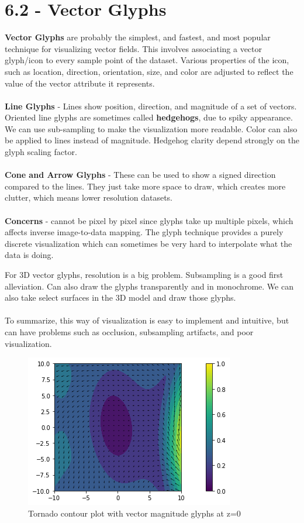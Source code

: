 \documentclass{article}
\begin{document}
\section*{6.2 - Vector Glyphs}
\textbf{Vector Glyphs} are probably the simplest, and fastest, and most popular technique for visualizing vector fields. This involves associating a vector glyph/icon to every sample point of the dataset. Various properties of the icon, such as location, direction, orientation, size, and color are adjusted to reflect the value of the vector attribute it represents.
\\\\
\textbf{Line Glyphs} - Lines show position, direction, and magnitude of a set of vectors. Oriented line glyphs are sometimes called \textbf{hedgehogs}, due to spiky appearance. We can use sub-sampling to make the visualization more readable. Color can also be applied to lines instead of magnitude. Hedgehog clarity depend strongly on the glyph scaling factor.
\\\\
\textbf{Cone and Arrow Glyphs} - These can be used to show a signed direction compared to the lines. They just take more space to draw, which creates more clutter, which means lower resolution datasets.
\\\\
\textbf{Concerns} - cannot be pixel by pixel since glyphs take up multiple pixels, which affects inverse image-to-data mapping. The glyph technique provides a purely discrete visualization which can sometimes be very hard to interpolate what the data is doing. 

For 3D vector glyphs, resolution is a big problem. Subsampling is a good first alleviation. Can also draw the glyphs transparently and in monochrome. We can also take select surfaces in the 3D model and draw those glyphs. 
\\\\
To summarize, this way of visualization is easy to implement and intuitive, but can have problems such as occlusion, subsampling artifacts, and poor visualization.

\begin{figure}[H]
\caption{Tornado contour plot with vector magnitude glyphs at z=0}
\centering
\includegraphics[scale=0.55]{tornado_2d_contour_glyphs.png}
\end{figure}
\end{document}
